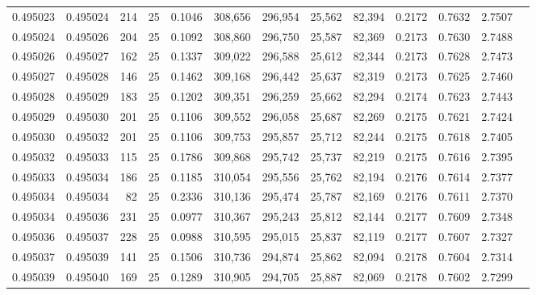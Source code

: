 \begin{tabular}{rrrrrrrrrrrrr}
0.495023 & 0.495024 &   214 &  25 &                                     0.1046 & 308,656 & 296,954 &  25,562 &  82,394 & 0.2172 & 0.7632 & 2.7507 \\
0.495024 & 0.495026 &   204 &  25 &                                     0.1092 & 308,860 & 296,750 &  25,587 &  82,369 & 0.2173 & 0.7630 & 2.7488 \\
0.495026 & 0.495027 &   162 &  25 &                                     0.1337 & 309,022 & 296,588 &  25,612 &  82,344 & 0.2173 & 0.7628 & 2.7473 \\
0.495027 & 0.495028 &   146 &  25 &                                     0.1462 & 309,168 & 296,442 &  25,637 &  82,319 & 0.2173 & 0.7625 & 2.7460 \\
0.495028 & 0.495029 &   183 &  25 &                                     0.1202 & 309,351 & 296,259 &  25,662 &  82,294 & 0.2174 & 0.7623 & 2.7443 \\
0.495029 & 0.495030 &   201 &  25 &                                     0.1106 & 309,552 & 296,058 &  25,687 &  82,269 & 0.2175 & 0.7621 & 2.7424 \\
0.495030 & 0.495032 &   201 &  25 &                                     0.1106 & 309,753 & 295,857 &  25,712 &  82,244 & 0.2175 & 0.7618 & 2.7405 \\
0.495032 & 0.495033 &   115 &  25 &                                     0.1786 & 309,868 & 295,742 &  25,737 &  82,219 & 0.2175 & 0.7616 & 2.7395 \\
0.495033 & 0.495034 &   186 &  25 &                                     0.1185 & 310,054 & 295,556 &  25,762 &  82,194 & 0.2176 & 0.7614 & 2.7377 \\
0.495034 & 0.495034 &    82 &  25 &                                     0.2336 & 310,136 & 295,474 &  25,787 &  82,169 & 0.2176 & 0.7611 & 2.7370 \\
0.495034 & 0.495036 &   231 &  25 &                                     0.0977 & 310,367 & 295,243 &  25,812 &  82,144 & 0.2177 & 0.7609 & 2.7348 \\
0.495036 & 0.495037 &   228 &  25 &                                     0.0988 & 310,595 & 295,015 &  25,837 &  82,119 & 0.2177 & 0.7607 & 2.7327 \\
0.495037 & 0.495039 &   141 &  25 &                                     0.1506 & 310,736 & 294,874 &  25,862 &  82,094 & 0.2178 & 0.7604 & 2.7314 \\
0.495039 & 0.495040 &   169 &  25 &                                     0.1289 & 310,905 & 294,705 &  25,887 &  82,069 & 0.2178 & 0.7602 & 2.7299 \\

\end{tabular}
